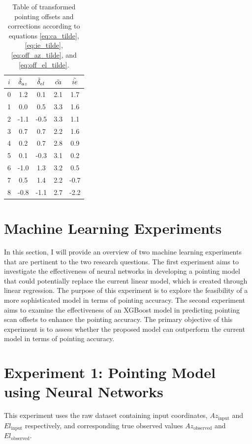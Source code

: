 \begin{table}[H]
    \centering
    \caption{Table of transformed pointing offsets and corrections according to equations \eqref{eq:ca_tilde}, \eqref{eq:ie_tilde}, \eqref{eq:off_az_tilde}, and \eqref{eq:off_el_tilde}.}
    \label{tab:tranform_offsets}
\begin{tabular}{ccccc}
\toprule
$i$ & $\Tilde{\delta}_{az}$ &  $\Tilde{\delta}_{el}$ &  $\Tilde{ca}$ &  $\Tilde{ie}$ \\
\midrule
0 &       1.2 &       0.1 &       2.1 &       1.7 \\
1 &       0.0 &       0.5 &       3.3 &       1.6 \\
2 &      -1.1 &      -0.5 &       3.3 &       1.1 \\
3 &       0.7 &       0.7 &       2.2 &       1.6 \\
4 &       0.2 &       0.7 &       2.8 &       0.9 \\
5 &       0.1 &      -0.3 &       3.1 &       0.2 \\
6 &      -1.0 &       1.3 &       3.2 &       0.5 \\
7 &       0.5 &       1.4 &       2.2 &      -0.7 \\
8 &      -0.8 &      -1.1 &       2.7 &      -2.2 \\
\bottomrule
\end{tabular}
\end{table}


\section{Machine Learning Experiments}
In this section, I will provide an overview of two machine learning experiments that are pertinent to the two research questions.
The first experiment aims to investigate the effectiveness of neural networks in developing a pointing model that could potentially replace the current linear model, which is created through linear regression.
The purpose of this experiment is to explore the feasibility of a more sophisticated model in terms of pointing accuracy.
The second experiment aims to examine the effectiveness of an XGBoost model in predicting pointing scan offsets to enhance the pointing accuracy.
The primary objective of this experiment is to assess whether the proposed model can outperform the current model in terms of pointing accuracy.

\section{Experiment 1: Pointing Model using Neural Networks}
This experiment uses the raw dataset containing input coordinates, $Az_{\text{input}}$ and $El_{\text{input}}$ respectively, and corresponding true observed values $Az_{\text{observed}}$ and $El_{\text{observed}}$.

